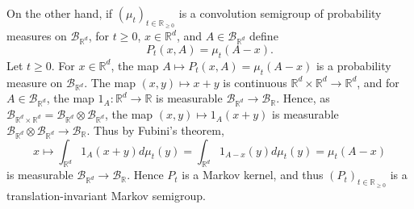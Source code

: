 \documentclass{article}
\theoremstyle{definition}
\theoremstyle{definition}
\begin{document}
On the other hand, if  $(\mu_t)_{t \in \mathbb{R}_{\geq 0}}$ is a convolution semigroup of probability measures
on $\mathscr{B}_{\mathbb{R}^d}$,
for $t \geq 0$, $x \in \mathbb{R}^d$, and $A \in \mathscr{B}_{\mathbb{R}^d}$ define
\[
P_t(x,A) = \mu_t(A-x).
\]
Let $t \geq 0$. For $x \in \mathbb{R}^d$,
the map $A \mapsto P_t(x,A) = \mu_t(A-x)$ is a probability measure on  $\mathscr{B}_{\mathbb{R}^d}$.
The map
$(x,y) \mapsto x+y$ is continuous $\mathbb{R}^d \times \mathbb{R}^d \to \mathbb{R}^d$,
and for $A \in \mathscr{B}_{\mathbb{R}^d}$, 
the map
$1_A:\mathbb{R}^d \to \mathbb{R}$ is 
measurable $\mathscr{B}_{\mathbb{R}^d} \to \mathscr{B}_{\mathbb{R}}$. Hence,
as $\mathscr{B}_{\mathbb{R}^d \times \mathbb{R}^d}=\mathscr{B}_{\mathbb{R}^d}
\otimes \mathscr{B}_{\mathbb{R}^d}$, the map
$(x,y) \mapsto 1_A(x+y)$ is measurable $\mathscr{B}_{\mathbb{R}^d}
\otimes \mathscr{B}_{\mathbb{R}^d}  \to \mathscr{B}_{\mathbb{R}}$. 
Thus by Fubini's theorem,
\[
x \mapsto 
\int_{\mathbb{R}^d} 1_A(x+y) d\mu_t(y)
= \int_{\mathbb{R}^d} 1_{A-x}(y) d\mu_t(y)
=\mu_t(A-x) 
\]
is measurable $\mathscr{B}_{\mathbb{R}^d} \to \mathscr{B}_{\mathbb{R}}$. 
Hence $P_t$ is a Markov kernel, and thus
$(P_t)_{t \in \mathbb{R}_{\geq 0}}$ is a translation-invariant Markov semigroup.
\end{document}
